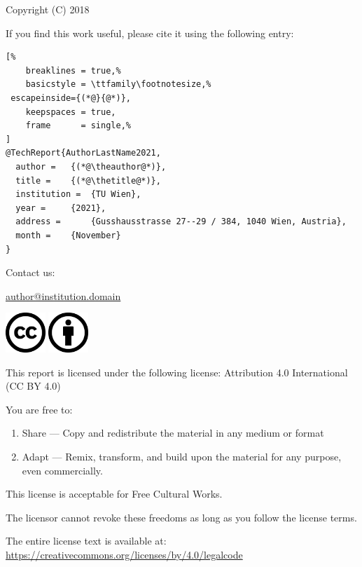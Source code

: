 Copyright (C) 2018 \theauthor

If you find this work useful, please cite it using the following \BibTeX{ } entry:

\vspace{1em}

\begin{lstlisting}[%
	breaklines = true,%
	basicstyle = \ttfamily\footnotesize,%
 escapeinside={(*@}{@*)},
	keepspaces = true,
	frame      = single,%
]
@TechReport{AuthorLastName2021,
  author = 	 {(*@\theauthor@*)},
  title = 	 {(*@\thetitle@*)},
  institution =  {TU Wien},
  year = 	 {2021},
  address = 	 {Gusshausstrasse 27--29 / 384, 1040 Wien, Austria},
  month = 	 {November}
}
\end{lstlisting}

\vspace{3em}
Contact us:

\href{E-mail address}{author@institution.domain}

\vfill

\includegraphics[height=1.5cm]{fig/cc-large.png}
\includegraphics[height=1.5cm]{fig/by-large.png}


This report is licensed under the following license:
Attribution 4.0 International (CC BY 4.0)

\vspace{3em}

You are free to:

\begin{enumerate}
   \item Share --- Copy and redistribute the material in any medium or format
   \item Adapt --- Remix, transform, and build upon the material for any purpose,
			even commercially.
\end{enumerate}

This license is acceptable for Free Cultural Works.

The licensor cannot revoke these freedoms as long as you follow the license terms.

The entire license text is available at:
\href{https://creativecommons.org/licenses/by/4.0/legalcode}
	{https://creativecommons.org/licenses/by/4.0/legalcode}
	
\pagebreak


